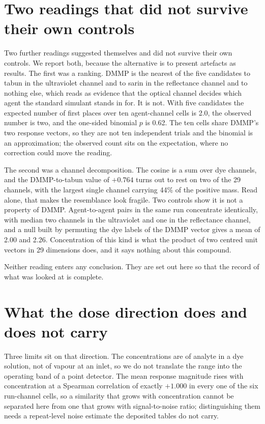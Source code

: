 \documentclass[journal=jacsat,manuscript=suppinfo,margin=1in]{achemso}
\begin{document}
\section{Two readings that did not survive their own controls}
\label{res:deadcontrols}

Two further readings suggested themselves and did not survive their own
controls. We report both, because the alternative is to present artefacts as
results. The first was a ranking. DMMP is the nearest of the five candidates
to tabun in the ultraviolet channel and to sarin in the reflectance channel
and to nothing else, which reads as evidence that the optical channel decides
which agent the standard simulant stands in for. It is not. With five
candidates the expected number of first places over ten agent-channel cells
is 2.0, the observed number is two, and the one-sided binomial $p$ is 0.62.
The ten cells share DMMP's two response vectors, so they are not ten
independent trials and the binomial is an approximation; the observed count
sits on the expectation, where no correction could move the reading.

The second was a channel decomposition. The cosine is a sum over dye
channels, and the DMMP-to-tabun value of $+0.764$ turns out to rest on two
of the 29 channels, with the largest single channel carrying 44\% of the
positive mass. Read alone, that makes the resemblance look fragile. Two
controls show it is not a property of DMMP. Agent-to-agent pairs in the
same run concentrate identically, with median two channels in the
ultraviolet and one in the reflectance channel, and a null built by
permuting the dye labels of the DMMP vector gives a mean of 2.00 and 2.26.
Concentration of this kind is what the product of two centred unit vectors
in 29 dimensions does, and it says nothing about this compound.

Neither reading enters any conclusion. They are set out here so that the
record of what was looked at is complete.

\section{What the dose direction does and does not carry}
\label{res:doselimits}

Three limits sit on that direction. The concentrations are of analyte in a dye
solution, not of vapour at an inlet, so we do not translate the range into the
operating band of a point detector. The mean response magnitude rises with
concentration at a Spearman correlation of exactly $+1.000$ in every one of the
six run-channel cells, so a similarity that grows with concentration cannot be
separated here from one that grows with signal-to-noise ratio; distinguishing
them needs a repeat-level noise estimate the deposited tables do not carry.
\end{document}
